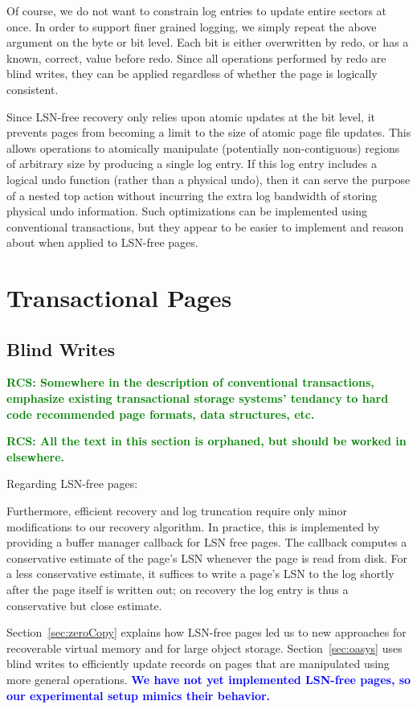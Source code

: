 \documentclass[letterpaper,twocolumn,10pt]{article}
\newcommand{\diff}[1]{\textcolor{blue}{\bf #1}}
\newcommand{\rcs}[1]{\textcolor{green}{\bf RCS: #1}}
\begin{document}
Of course, we do not want to constrain log entries to update entire
sectors at once.  In order to support finer grained logging, we simply
repeat the above argument on the byte or bit level.  Each bit is
either overwritten by redo, or has a known, correct, value before
redo.  Since all operations performed by redo are blind writes, they
can be applied regardless of whether the page is logically consistent.

Since LSN-free recovery only relies upon atomic updates at the bit
level, it prevents pages from becoming a limit to the size of atomic
page file updates.  This allows operations to atomically manipulate
(potentially non-contiguous) regions of arbitrary size by producing a
single log entry.  If this log entry includes a logical undo function
(rather than a physical undo), then it can serve the purpose of a
nested top action without incurring the extra log bandwidth of storing
physical undo information.  Such optimizations can be implemented
using conventional transactions, but they appear to be easier to
implement and reason about when applied to LSN-free pages.

\section{Transactional Pages}

\subsection{Blind Writes}
\label{sec:blindWrites}
\rcs{Somewhere in the description of conventional transactions, emphasize existing transactional storage systems' tendancy to hard code recommended page formats, data structures, etc.}

\rcs{All the text in this section is orphaned, but should be worked in elsewhere.}

Regarding LSN-free pages:

Furthermore, efficient recovery and
log truncation require only minor modifications to our recovery
algorithm.  In practice, this is implemented by providing a buffer manager callback
for LSN free pages.  The callback computes a
conservative estimate of the page's LSN whenever the page is read from disk.
For a less conservative estimate, it suffices to write a page's LSN to
the log shortly after the page itself is written out; on recovery the
log entry is thus a conservative but close estimate.

Section~\ref{sec:zeroCopy} explains how LSN-free pages led us to new 
approaches for recoverable virtual memory and for large object storage.  
Section~\ref{sec:oasys} uses blind writes to efficiently update records 
on pages that are manipulated using more general operations.  \diff{We 
have not yet implemented LSN-free pages, so our experimental setup mimics
their behavior.}
\end{document}
